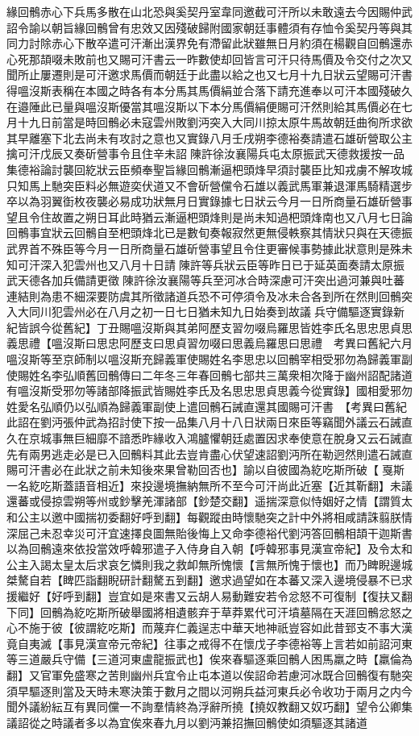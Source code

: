 緣回鶻赤心下兵馬多散在山北恐與奚契丹室韋同邀截可汗所以未敢遠去今因賜仲武詔令諭以朝旨緣回鶻曾有忠效又因殘破歸附國家朝廷事體須有存恤令奚契丹等與其同力討除赤心下散卒遣可汗漸出漢界免有滯留此狀雖無日月約須在楊觀自回鶻還赤心死那頡啜未敗前也又賜可汗書云一昨數使却回皆言可汗只待馬價及令交付之次又聞所止屢遷則是可汗邀求馬價而朝廷于此盡以給之也又七月十九日狀云望賜可汗書得嗢沒斯表稱在本國之時各有本分馬其馬價絹並合落下請充進奉以可汗本國殘破久在邉陲此已量與嗢沒斯優當其嗢沒斯以下本分馬價絹便賜可汗然則給其馬價必在七月十九日前當是時回鶻必未寇雲州敗劉沔突入大同川掠太原牛馬故朝廷曲徇所求欲其早離塞下北去尚未有攻討之意也又實錄八月壬戌朔李德裕奏請遣石雄斫營取公主擒可汗戊辰又奏斫營事令且住辛未詔陳許徐汝襄陽兵屯太原振武天德救援按一品集德裕論討襲回紇狀云臣頻奉聖旨緣回鶻漸逼杷頭烽早須討襲臣比知戎虜不解攻城只知馬上馳突臣料必無遊奕伏道又不會斫營儻令石雄以義武馬軍兼退渾馬騎精選步卒以為羽翼衘枚夜襲必易成功狀無月日實錄據七日狀云今月一日所商量石雄斫營事望且令住故置之朔日耳此時猶云漸逼杷頭烽則是尚未知過杷頭烽南也又八月七日論回鶻事宜狀云回鶻自至杷頭烽北已是數旬奏報寂然更無侵軼察其情狀只與在天德振武界首不殊臣等今月一日所商量石雄斫營事望且令住更審候事勢據此狀意則是殊未知可汗深入犯雲州也又八月十日請陳許等兵狀云臣等昨日已于延英面奏請太原振武天德各加兵備請更徵陳許徐汝襄陽等兵至河冰合時深慮可汗突出過河兼與吐蕃連結則為患不細深要防虞其所徵諸道兵恐不可停須令及冰未合各到所在然則回鶻突入大同川犯雲州必在八月之初一日七日猶未知九日始奏到故議兵守備驅逐實錄新紀皆誤今從舊紀】丁丑賜嗢沒斯與其弟阿歷支習勿啜烏羅思皆姓李氏名思忠思貞思義思禮【嗢沒斯曰思忠阿歷支曰思貞習勿啜曰思義烏羅思曰思禮　考異曰舊紀六月嗢沒斯等至京師制以嗢沒斯充歸義軍使賜姓名李思忠以回鶻宰相受邪勿為歸義軍副使賜姓名李弘順舊回鶻傳曰二年冬三年春回鶻七部共三萬衆相次降于幽州詔配諸道有嗢沒斯受邪勿等諸部降振武皆賜姓李氏及名思忠思貞思義今從實錄】國相愛邪勿姓愛名弘順仍以弘順為歸義軍副使上遣回鶻石誡直還其國賜可汗書　【考異曰舊紀此詔在劉沔張仲武為招討使下按一品集八月十八日狀兩日來臣等竊聞外議云石誡直久在京城事無巨細靡不諳悉昨緣收入鴻臚懼朝廷處置因求奉使意在脫身又云石誡直先有兩男逃走必是已入回鶻料其此去豈肯盡心伏望速詔劉沔所在勒迥然則遣石誡直賜可汗書必在此狀之前未知後來果曾勒回否也】諭以自彼國為紇吃斯所破【戛斯一名紇吃斯蓋語音相近】來投邊境撫納無所不至今可汗尚此近塞【近其靳翻】未議還蕃或侵掠雲朔等州或鈔擊羌渾諸部【鈔楚交翻】遥揣深意似恃姻好之情【謂質太和公主以邀中國揣初委翻好呼到翻】每觀蹤由時懷馳突之計中外將相咸請誅翦朕情深屈己未忍幸災可汗宜速擇良圖無貽後悔上又命李德裕代劉沔答回鶻相頡干迦斯書以為回鶻遠來依投當效呼韓邪遣子入侍身自入朝【呼韓邪事見漢宣帝紀】及令太和公主入謁太皇太后求哀乞憐則我之救卹無所愧懷【言無所愧于懷也】而乃睥睨邊城桀驁自若【睥匹詣翻睨研計翻驁五到翻】邀求過望如在本蕃又深入邊境侵暴不已求援繼好【好呼到翻】豈宜如是來書又云胡人易動難安若令忿怒不可復制【復扶又翻下同】回鶻為紇吃斯所破舉國將相遺骸弃于草莽累代可汗墳墓隔在天涯回鶻忿怒之心不施于彼【彼謂紇吃斯】而蔑弃仁義逞志中華天地神祇豈容如此昔郅支不事大漢竟自夷滅【事見漢宣帝元帝紀】往事之戒得不在懷戊子李德裕等上言若如前詔河東等三道嚴兵守備【三道河東盧龍振武也】俟來春驅逐乘回鶻人困馬羸之時【羸倫為翻】又官軍免盛寒之苦則幽州兵宜令止屯本道以俟詔命若慮河冰既合回鶻復有馳突須早驅逐則當及天時未寒決策于數月之間以河朔兵益河東兵必令收功于兩月之内今聞外議紛紜互有異同儻一不詢羣情終為浮辭所撓【撓奴教翻又奴巧翻】望令公卿集議詔從之時議者多以為宜俟來春九月以劉沔兼招撫回鶻使如須驅逐其諸道